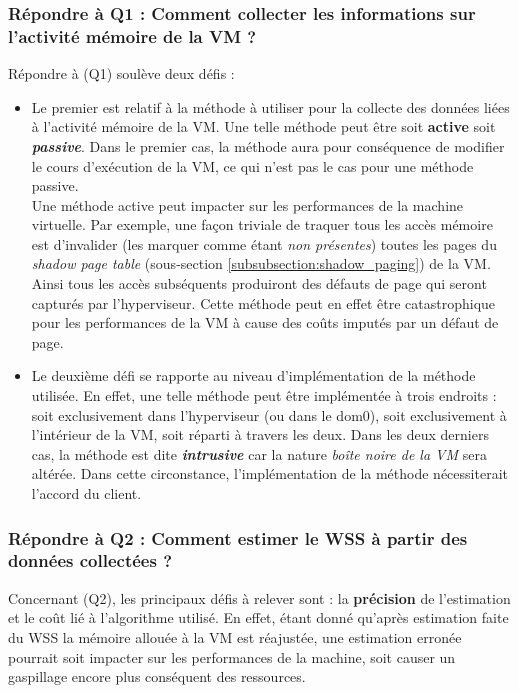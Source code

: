\subsubsection{Répondre à Q1 : Comment collecter les informations sur l'activité mémoire de la VM ?}
Répondre à (Q1) soulève deux défis :
\begin{itemize}
    \item Le premier est relatif à la méthode à utiliser pour la collecte des données liées à l'activité mémoire de la VM. Une telle méthode peut être soit \textbf{active} soit \textbf{\textit{passive}}. Dans le premier cas, la méthode aura pour conséquence de modifier le cours d'exécution de la VM, ce qui n'est pas le cas pour une méthode passive.\\
    Une méthode active peut impacter sur les performances de la machine virtuelle. Par exemple, une façon triviale de traquer tous les accès mémoire est d'invalider (les marquer comme étant \textit{non présentes}) toutes les pages du \textit{shadow page table} (sous-section \ref{subsubsection:shadow_paging}) de la VM. Ainsi tous les accès subséquents produiront des défauts de page qui seront capturés par l'hyperviseur. Cette méthode peut en effet être catastrophique pour les performances de la VM à cause des coûts imputés par un défaut de page.
    
    \item Le deuxième défi se rapporte au niveau d'implémentation de la méthode utilisée. En effet, une telle méthode peut être implémentée à trois endroits : soit exclusivement dans l'hyperviseur (ou dans le dom0), soit exclusivement à l'intérieur de la VM, soit réparti à travers les deux. Dans les deux derniers cas, la méthode est dite \textbf{\textit{intrusive}} car la nature \textit{boîte noire de la VM} sera altérée. Dans cette circonstance, l'implémentation de la méthode nécessiterait l'accord du client.
\end{itemize}

\subsubsection{Répondre à Q2 : Comment estimer le WSS à partir des données collectées ?}
Concernant (Q2), les principaux défis à relever sont : la \textbf{précision} de l'estimation et le coût lié à l'algorithme utilisé. En effet, étant donné qu'après estimation faite du WSS la mémoire allouée à la VM est réajustée, une estimation erronée pourrait soit impacter sur les performances de la machine, soit causer un gaspillage encore plus conséquent des ressources.

